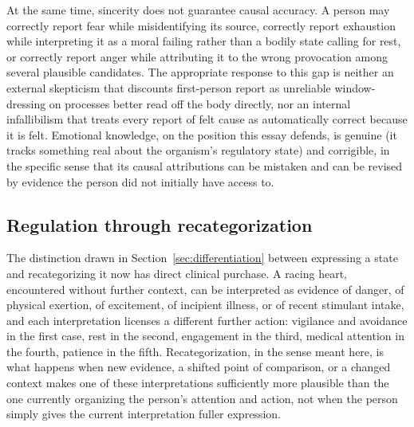 \documentclass[11pt]{article}
\begin{document}
At the same time, sincerity does not guarantee causal accuracy. A person may correctly report fear while misidentifying its source, correctly report exhaustion while interpreting it as a moral failing rather than a bodily state calling for rest, or correctly report anger while attributing it to the wrong provocation among several plausible candidates. The appropriate response to this gap is neither an external skepticism that discounts first-person report as unreliable window-dressing on processes better read off the body directly, nor an internal infallibilism that treats every report of felt cause as automatically correct because it is felt. Emotional knowledge, on the position this essay defends, is genuine (it tracks something real about the organism's regulatory state) and corrigible, in the specific sense that its causal attributions can be mistaken and can be revised by evidence the person did not initially have access to.

\subsection{Regulation through recategorization}

The distinction drawn in Section~\ref{sec:differentiation} between expressing a state and recategorizing it now has direct clinical purchase. A racing heart, encountered without further context, can be interpreted as evidence of danger, of physical exertion, of excitement, of incipient illness, or of recent stimulant intake, and each interpretation licenses a different further action: vigilance and avoidance in the first case, rest in the second, engagement in the third, medical attention in the fourth, patience in the fifth. Recategorization, in the sense meant here, is what happens when new evidence, a shifted point of comparison, or a changed context makes one of these interpretations sufficiently more plausible than the one currently organizing the person's attention and action, not when the person simply gives the current interpretation fuller expression.
\end{document}
